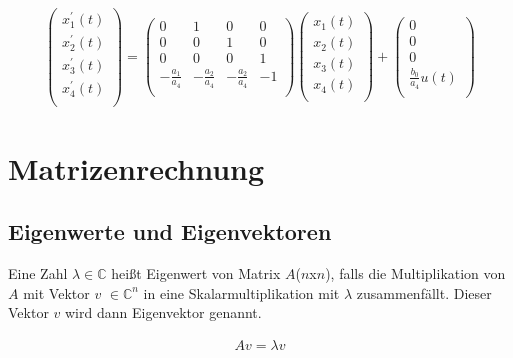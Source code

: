 \documentclass[10pt,a4paper]{article}
\begin{document}
  \begin{mdframed}[style=exercise]
    \begin{align}
        \begin{pmatrix}
        x_1^{'}(t) \\
        x_2^{'}(t) \\
        x_3^{'}(t) \\
        x_4^{'}(t) \\
        \end{pmatrix} 
        =
        \begin{pmatrix}
            0 & 1 & 0 & 0 \\
            0 & 0 & 1 & 0 \\
            0 & 0 & 0 & 1 \\
            -\frac{a_1}{a_4} & -\frac{a_2}{a_4} & -\frac{a_2}{a_4} &  -1 \\
        \end{pmatrix}
        \begin{pmatrix}
        x_1(t) \\
        x_2(t) \\
        x_3(t) \\
        x_4(t) \\
        \end{pmatrix} 
        +
        \begin{pmatrix}
        0 \\
        0 \\
        0 \\
        \frac{b_0}{a_4}u(t) \\
        \end{pmatrix} 
    \end{align}
  \end{mdframed}


\section{Matrizenrechnung}
\subsection{Eigenwerte und Eigenvektoren}
Eine Zahl $\lambda \in \mathbb{C}$ heißt Eigenwert von Matrix $A$($n$x$n$),
falls die Multiplikation von $A$ mit Vektor $v$ $\in \mathbb{C}^n$ in eine Skalarmultiplikation
mit $\lambda$ zusammenfällt. Dieser Vektor $v$ wird dann Eigenvektor genannt.
  \begin{mdframed}[style=exercise]
    \begin{align}
        Av = \lambda v
    \end{align}
  \end{mdframed}
\end{document}
